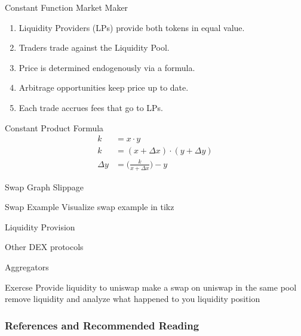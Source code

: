 \documentclass[]{beamer}
\begin{document}
\begin{frame}{Constant Function Market Maker}
\begin{figure}
\begin{tikzpicture}
	\end{tikzpicture}
\end{figure}
\vspace{1em}
\begin{enumerate}
	\item<2-> Liquidity Providers (LPs) provide both tokens in equal value.
	\item<3-> Traders trade against the Liquidity Pool.
	\item<4-> Price is determined endogenously via a formula.
	\item<5-> Arbitrage opportunities keep price up to date.
	\item<5-> Each trade accrues fees that go to LPs.
\end{enumerate}
\end{frame}


\begin{frame}{Constant Product Formula}
\begin{align*}
		k &= x \cdot y \\
		k &= (x + \Delta x) \cdot (y + \Delta y) \\
		\Delta y &= \biggl( \frac{k}{x + \Delta x} \biggr) - y 
	\end{align*} 
\end{frame}

\begin{frame}{Swap}
Graph
Slippage
\end{frame}

\begin{frame}{Swap Example}
Visualize swap example in tikz
\end{frame}

\begin{frame}{Liquidity Provision}

\end{frame}

\begin{frame}{Other DEX protocols}

\end{frame}

\begin{frame}{Aggregators}

\end{frame}


\begin{frame}{Exercse}
Provide liquidity to uniswap
make a swap on uniswap in the same pool
remove liquidity and analyze what happened to you liquidity position
\end{frame}



\begin{frame}%
\frametitle{References and Recommended Reading}
	
	
\end{frame}
\end{document}
